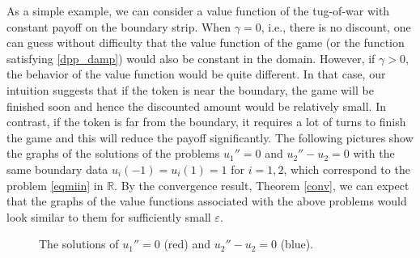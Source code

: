 \documentclass[english]{amsart}
\newcommand{\eps}{\varepsilon}
\theoremstyle{plain}
\theoremstyle{definition}
\theoremstyle{remark}
\numberwithin{equation}{section}
\begin{document}
As a simple example, we can consider a value function of the tug-of-war with constant payoff on the boundary strip.
When $\gamma=0$, i.e., there is no discount, one can guess without difficulty that the value function of the game (or the function satisfying \eqref{dpp_damp}) would also be constant
in the domain.
However, if $\gamma >0$, the behavior of the value function would be quite different.
In that case, our intuition suggests that if the token is near the boundary, the game will be finished soon and hence the discounted amount would be relatively small.
In contrast, if the token is far from the boundary, it requires a lot of turns to finish the game and this will reduce the payoff significantly.
The following pictures show the graphs of the solutions of the problems $u_1''=0$ and $u_2''-u_2=0$ with the same boundary data $u_i(-1)=u_i(1)=1$ for $i=1,2$, which correspond to the problem \eqref{eqmiin} in $\mathbb{R}$. 
By the convergence result, Theorem \ref{conv}, we can expect that the graphs of the value functions associated with the above problems would look similar to them for sufficiently small $\eps$.
\begin{center}
\begin{figure}
    \centering
{}
    \caption{The solutions of $u_1''=0$ (red) and $u_2''-u_2=0$ (blue).}
    \label{fig:enter-label}
\end{figure}
\end{center}
\end{document}

